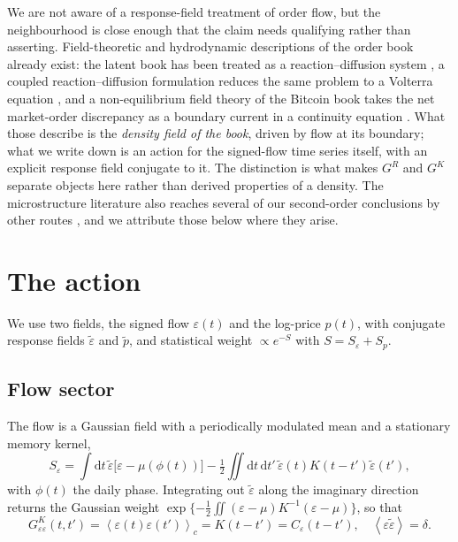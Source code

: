 \documentclass[aps,pre,twocolumn,superscriptaddress,floatfix,nofootinbib]{revtex4-2}
\newcommand{\eps}{\varepsilon}
\newcommand{\epst}{\tilde{\eps}}
\newcommand{\avg}[1]{\left\langle #1 \right\rangle}
\newcommand{\dd}{\mathrm{d}}
\begin{document}
We are not aware of a response-field treatment of order flow, but the
neighbourhood is close enough that the claim needs qualifying rather than
asserting. Field-theoretic and hydrodynamic descriptions of the order book
already exist: the latent book has been treated as a reaction--diffusion system
\cite{donier2015}, a coupled reaction--diffusion formulation reduces the same
problem to a Volterra equation \cite{angstmann2026}, and a non-equilibrium
field theory of the Bitcoin book takes the net market-order discrepancy as a
boundary current in a continuity equation \cite{shi2021}. What those describe
is the \emph{density field of the book}, driven by flow at its boundary; what
we write down is an action for the signed-flow time series itself, with an
explicit response field conjugate to it. The distinction is what makes $G^R$
and $G^K$ separate objects here rather than derived properties of a density.
The microstructure literature also reaches several of our second-order
conclusions by other routes \cite{gerig2008,jaisson2014,taranto2016,muhlekarbe2026},
and we attribute those below where they arise.

\section{The action}
\label{sec:action}

We use two fields, the signed flow $\eps(t)$ and the log-price $p(t)$, with
conjugate response fields $\epst$ and $\tilde p$, and statistical weight
$\propto e^{-S}$ with $S=S_\eps+S_p$.

\subsection{Flow sector}

The flow is a Gaussian field with a periodically modulated mean and a stationary
memory kernel,
\begin{equation}
  S_\eps = \int\!\dd t\, \epst\bigl[\eps-\mu(\phi(t))\bigr]
         - \tfrac12\iint\!\dd t\,\dd t'\, \epst(t)K(t-t')\epst(t') ,
  \label{eq:Seps}
\end{equation}
with $\phi(t)$ the daily phase. Integrating out $\epst$ along the imaginary
direction returns the Gaussian weight
$\exp\{-\tfrac12\iint(\eps-\mu)K^{-1}(\eps-\mu)\}$, so that
\begin{equation}
  G^K_{\eps\eps}(t,t')=\avg{\eps(t)\eps(t')}_c=K(t-t')=C_\eps(t-t') ,
  \quad \avg{\eps\epst}=\delta .
\end{equation}
\end{document}
